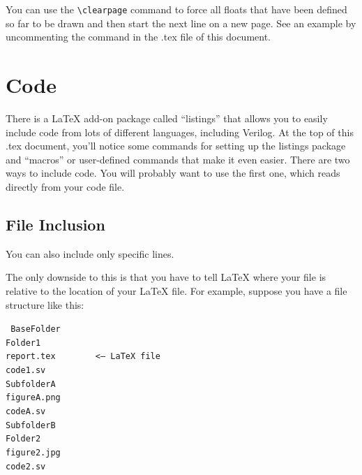 \documentclass[11pt]{article}
\newcommand{\Verilog}[2][]{%
	
}
\begin{document}
You can use the \verb|\clearpage| command to force all floats that have been defined so far to be drawn and then start the next line on a new page.  See an example by uncommenting the command in the .tex file of this document.


\section*{Code}
There is a LaTeX add-on package called ``listings'' that allows you to easily include code from lots of different languages, including Verilog.  At the top of this .tex document, you'll notice some commands for setting up the listings package and ``macros'' or user-defined commands that make it even easier.  There are two ways to include code.  You will probably want to use the first one, which reads directly from your code file.  

\subsection*{File Inclusion}

\Verilog[caption=File-included Verilog code example,label=code:file_ex]{lab1_example_code.sv}

You can also include only specific lines.

\Verilog[firstline=6, lastline=7, caption=Selected lines from example file,
label=code:file_ex_lines]{lab1_example_code.sv}

The only downside to this is that you have to tell LaTeX where your file is relative to the location of your LaTeX file.  For example, suppose you have a file structure like this:

\texttt{%
\hspace*{5ex}BaseFolder \\
	\hspace*{10ex}Folder1 \\
		\hspace*{15ex}report.tex ~~~~~~ <-- LaTeX file\\
		\hspace*{15ex}code1.sv \\
		\hspace*{15ex}SubfolderA \\
			\hspace*{20ex}figureA.png \\
			\hspace*{20ex}codeA.sv \\
		\hspace*{15ex}SubfolderB \\
	\hspace*{10ex}Folder2 \\	
		\hspace*{15ex}figure2.jpg \\
		\hspace*{15ex}code2.sv 
}
\end{document}
